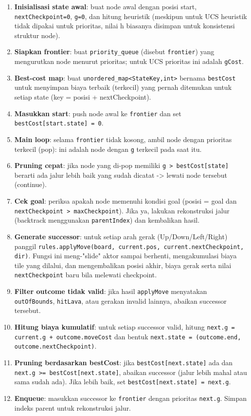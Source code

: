 \begin{enumerate}
    \item \textbf{Inisialisasi state awal}: buat node awal dengan posisi start, \texttt{nextCheckpoint=0}, \texttt{g=0}, dan hitung heuristik (meskipun untuk UCS heuristik tidak dipakai untuk prioritas, nilai h biasanya disimpan untuk konsistensi struktur node).
    \item \textbf{Siapkan frontier}: buat \texttt{priority\_queue} (disebut \texttt{frontier}) yang mengurutkan node menurut prioritas; untuk UCS prioritas ini adalah \texttt{gCost}.
    \item \textbf{Best-cost map}: buat \texttt{unordered\_map<StateKey,int>} bernama \texttt{bestCost} untuk menyimpan biaya terbaik (terkecil) yang pernah ditemukan untuk setiap state (key = posisi + nextCheckpoint).
    \item \textbf{Masukkan start}: push node awal ke \texttt{frontier} dan set \texttt{bestCost[start.state] = 0}.
    \item \textbf{Main loop}: selama \texttt{frontier} tidak kosong, ambil node dengan prioritas terkecil (pop): ini adalah node dengan \texttt{g} terkecil pada saat itu.
    \item \textbf{Pruning cepat}: jika node yang di-pop memiliki \texttt{g > bestCost[state]} berarti ada jalur lebih baik yang sudah dicatat -> lewati node tersebut (continue).
    \item \textbf{Cek goal}: periksa apakah node memenuhi kondisi goal (posisi = goal dan \texttt{nextCheckpoint > maxCheckpoint}). Jika ya, lakukan rekonstruksi jalur (backtrack menggunakan \texttt{parentIndex}) dan kembalikan hasil.
    \item \textbf{Generate successor}: untuk setiap arah gerak (Up/Down/Left/Right) panggil \texttt{rules.applyMove(board, current.pos, current.nextCheckpoint, dir)}. Fungsi ini meng-"slide" aktor sampai berhenti, mengakumulasi biaya tile yang dilalui, dan mengembalikan posisi akhir, biaya gerak serta nilai \texttt{nextCheckpoint} baru bila melewati checkpoint.
    \item \textbf{Filter outcome tidak valid}: jika hasil \texttt{applyMove} menyatakan \texttt{outOfBounds}, \texttt{hitLava}, atau gerakan invalid lainnya, abaikan successor tersebut.
    \item \textbf{Hitung biaya kumulatif}: untuk setiap successor valid, hitung \texttt{next.g = current.g + outcome.moveCost} dan bentuk \texttt{next.state = (outcome.end, outcome.nextCheckpoint)}.
    \item \textbf{Pruning berdasarkan bestCost}: jika \texttt{bestCost[next.state]} ada dan \texttt{next.g >= bestCost[next.state]}, abaikan successor (jalur lebih mahal atau sama sudah ada). Jika lebih baik, set \texttt{bestCost[next.state] = next.g}.
    \item \textbf{Enqueue}: masukkan successor ke \texttt{frontier} dengan prioritas \texttt{next.g}. Simpan indeks parent untuk rekonstruksi jalur.
\end{enumerate}

